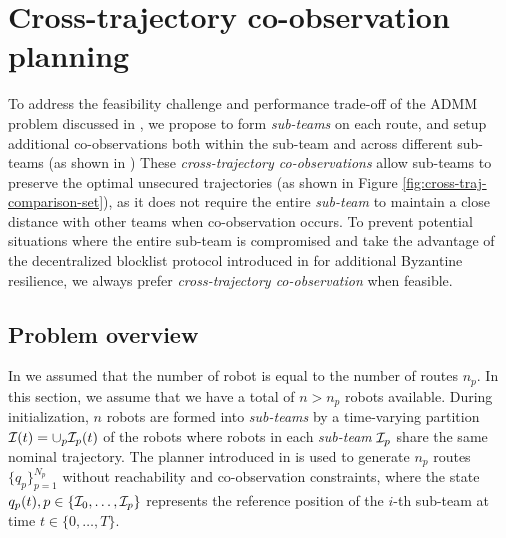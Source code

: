 \documentclass[journal]{IEEEtran}  %
\begin{document}
\section{Cross-trajectory co-observation planning}\label{sec:cross-trajectory}

To address the feasibility challenge and performance trade-off of the ADMM problem discussed in , we propose to form \emph{sub-teams} on each route, and setup additional co-observations both within the sub-team and across different sub-teams (as shown in )
These \emph{cross-trajectory co-observations} allow sub-teams to preserve the optimal unsecured trajectories (as shown in Figure \ref{fig:cross-traj-comparison-set}), as it does not require the entire \emph{sub-team} to maintain a close distance with other teams when co-observation occurs. To prevent potential situations where the entire sub-team is compromised and take the advantage of the decentralized blocklist protocol introduced in \cite{wardega2023byzantine} for additional Byzantine resilience, we always prefer \emph{cross-trajectory co-observation} when feasible. 



\subsection{Problem overview}


In  we assumed that the number of robot is equal to the number of routes $n_p$.
In this section, we assume that we have a total of $n>n_p$ robots available. During initialization, $n$ robots are formed into \emph{sub-teams} by a time-varying partition $\mathcal{I}(t)=\cup_p \mathcal{I}_p(t)$ of the robots where robots in each \emph{sub-team} $\mathcal{I}_p$ share the same nominal trajectory. The planner introduced in  is used to generate $n_p$ routes $\{q_p\}_{p=1}^{N_p}$ without reachability and co-observation constraints, where the state $q_p(t), p \in\{\mathcal{I}_0,\ldots,\mathcal{I}_{p}\}$ represents the reference position of the $i$-th sub-team at time $t\in\{0, \dots, T\}$. 
\end{document}
